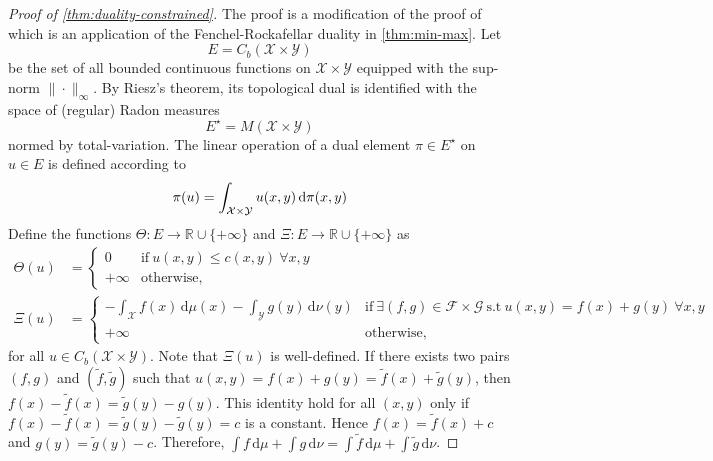 \documentclass[10pt]{article}
\newcommand{\ud}{\,\mathrm{d}}
\renewcommand{\tilde}{\widetilde}
\newcommand{\real}{\mathbb{R}}
\newcommand{\calF}{\mathcal{F}}
\newcommand{\calG}{\mathcal{G}}
\newcommand{\calX}{\mathcal{X}}
\newcommand{\calY}{\mathcal{Y}}
\numberwithin{equation}{section}
\begin{document}
\begin{proof}[Proof of \autoref{thm:duality-constrained}]
	The proof is a modification of the proof of \cite[Theorem~1.3~pp 26]{villani2003topics} which is an application of the Fenchel-Rockafellar duality in \autoref{thm:min-max}. 
	Let
	\begin{equation*}
	E=C_b(\calX \times \calY)
	\end{equation*} 
	be the set of all bounded continuous functions on $\calX \times \calY$ equipped with the sup-norm $\|\cdot\|_\infty$. By Riesz's theorem, its topological dual is identified with the space of (regular) Radon measures 
	\begin{equation*}
	E^\star = M(\calX \times \calY)
	\end{equation*}
	normed by total-variation. The linear operation of a dual element $\pi \in E^\star$ on $u \in E$ is defined according to 
	\begin{equation*}
	\pi(u)=\int_{\cal X\times \calY} u(x,y)\ud \pi(x,y)
	\end{equation*}
	Define the functions $\Theta:E \to \real \cup \{+\infty\}$ and $\Xi:E \to \real \cup \{+\infty\}$ as
	\begin{align*}
	\Theta(u) &= \begin{cases}
	0 & \text{if} ~ u(x,y)\leq c(x,y) ~\forall x,y\\
	+\infty & \text{otherwise,}
	\end{cases}\\
	\Xi(u) &= \begin{cases}
	-\int_\calX f(x)\ud \mu(x)- \int_\calY g(y)\ud\nu(y) & \text{if}~\exists (f,g)\in \calF\times \calG~\text{s.t}~u(x,y)=f(x)+g(y)~\forall x,y\\
	+\infty & \text{otherwise,}
	\end{cases}
	\end{align*}
	for all $u \in C_b(\calX\times \calY)$. 
	Note that $\Xi(u)$ is well-defined. If there exists two pairs $(f,g)$ and $(\tilde{f},\tilde{g})$ such that $u(x,y)=f(x) + g(y)=\tilde{f}(x)+\tilde{g}(y)$, then $f(x)-\tilde{f}(x)=\tilde{g}(y)-{g}(y)$. This identity hold for all $(x,y)$ only if $f(x)-\tilde{f}(x)=\tilde{g}(y)-\tilde{g}(y)=c$ is a constant. Hence $f(x)=\tilde{f}(x)+c$ and $g(y)=\tilde{g}(y)-c$. Therefore, $\int f \ud \mu +\int g \ud \nu = \int \tilde{f}\ud \mu + \int \tilde{g}\ud \nu$.
	\medskip
	

\end{proof}
\end{document}
